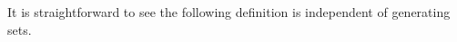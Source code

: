 \documentclass[12pt]{article}
\begin{document}







 It is straightforward to see the following definition is independent of generating sets. 
\end{document}
